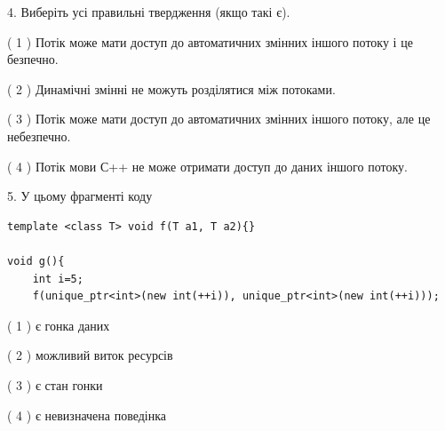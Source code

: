 \documentclass[12pt, ukrainian]{article}
\begin{document}
\begin {large}
{%
4. Виберіть усі правильні твердження (якщо такі є).\par
\vspace{2mm}

( 1 ) Потік може мати доступ до автоматичних змінних іншого потоку і це безпечно.%

( 2 ) Динамічні змінні не можуть розділятися між потоками.%

( 3 ) Потік може мати доступ до автоматичних змінних іншого потоку, але це небезпечно.%

( 4 ) Потік мови С++ не може отримати доступ до даних іншого потоку.%


5. У цьому фрагменті коду
\begin{verbatim}
template <class T> void f(T a1, T a2){}

void g(){
    int i=5;
    f(unique_ptr<int>(new int(++i)), unique_ptr<int>(new int(++i)));
\end{verbatim}

( 1 ) є гонка даних%

( 2 ) можливий виток ресурсів%

( 3 ) є стан гонки%

( 4 ) є невизначена поведінка%
}
\end {large}
\end{document}
